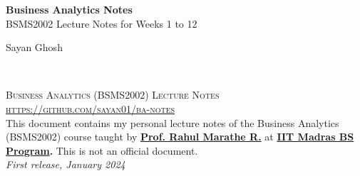 \documentclass[11pt,fleqn]{book} %
\begin{document}

\begingroup
\thispagestyle{empty}
\centering
\vspace*{5cm}
\par\normalfont\fontsize{35}{35}\sffamily\selectfont
\textbf{Business Analytics Notes}\\
{\LARGE BSMS2002 Lecture Notes for Weeks 1 to 12}\par %
\vspace*{1cm}
{\Huge Sayan Ghosh}\par %
\endgroup


\newpage
~\vfill
\thispagestyle{empty}


\noindent \textsc{Business Analytics (BSMS2002) Lecture Notes}\\

\noindent \textsc{\url{https://github.com/sayan01/ba-notes}}\\ %

\noindent This document contains my personal lecture notes
of the Business Analytics (BSMS2002) course taught by
\textbf{
\href{https://doms.iitm.ac.in/index.php/rrm}{Prof. Rahul Marathe R.}
}
at
\textbf{
\href{https://study.iitm.ac.in/ds/}{IIT Madras BS Program}.
}
This is not an official document.\\ %

\noindent \textit{First release, January 2024} %



\pagestyle{empty} %

\tableofcontents %
\end{document}
